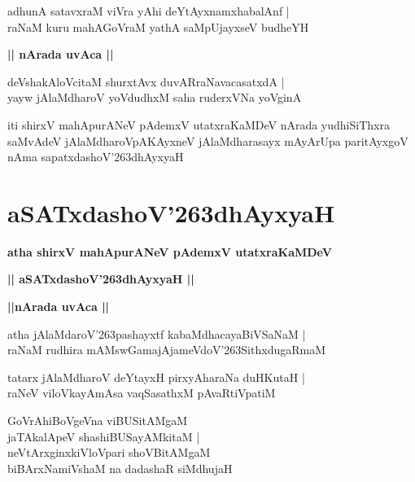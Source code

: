 \documentclass[twoside,12pt,openright]{book}
\def\S{\char'263}
\newcounter{shloka}[chapter]
\def\uvaca#1{\centerline{{\large\textbf{#1}}}}
\begin{document}
\begin{shloka}%
adhunA satavxraM viVra yAhi deYtAyxnamxhabalAnf |\\
raNaM kuru mahAGoVraM yathA saMpUjayxseV budheYH 
\end{shloka}

\uvaca{|| nArada uvAca ||}

\begin{shloka}%
deVshakAloVcitaM shurxtAvx duvARraNavacasatxdA |\\
yayw jAlaMdharoV yoVdudhxM saha ruderxVNa yoVginA 
\end{shloka}


\begin{center}
iti shirxV mahApurANeV pAdemxV utatxraKaMDeV  nArada yudhiSiThxra saMvAdeV jAlaMdharoVpAKAyxneV 
jAlaMdharasayx mAyArUpa paritAyxgoV nAma sapatxdashoV\S dhAyxyaH 
\end{center}

\chapter{aSATxdashoV\S dhAyxyaH}

\begin{center}
{\LARGE\bfseries atha shirxV mahApurANeV pAdemxV utatxraKaMDeV} 
\end{center}

\begin{center}
{\LARGE\bfseries  || aSATxdashoV\S dhAyxyaH ||}
\end{center}	

\uvaca{||nArada uvAca ||}

\begin{shloka}%
atha jAlaMdaroV\S pashayxtf kabaMdhacayaBiVSaNaM |\\
raNaM rudhira mAMswGamajAjameVdoV\S SithxdugaRmaM 
\end{shloka}

\begin{shloka}%
tatarx jAlaMdharoV deYtayxH pirxyAharaNa duHKutaH |\\
raNeV viloVkayAmAsa vaqSasathxM pAvaRtiVpatiM 
\end{shloka}

\begin{shloka}%
GoVrAhiBoVgeVna viBUSitAMgaM \\
jaTAkalApeV shashiBUSayAMkitaM |\\
neVtArxginxkiVloVpari shoVBitAMgaM \\
biBArxNamiVshaM na dadashaR siMdhujaH
\end{shloka}
\end{document}
